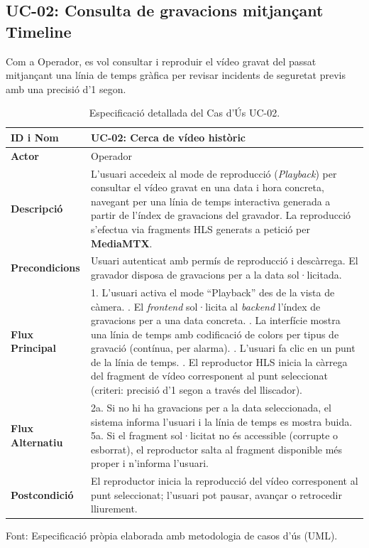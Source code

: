 \clearpage
\subsection{UC-02: Consulta de gravacions mitjançant Timeline}
Com a Operador, es vol consultar i reproduir el vídeo gravat del passat mitjançant una línia de temps gràfica per revisar incidents de seguretat previs amb una precisió d'1 segon.

\begin{table}[htbp]
  \centering
  \small
  \begin{tabular}{|l|p{10cm}|}
    \hline
    \rowcolor{backcolour} \textbf{ID i Nom} & \textbf{UC-02: Cerca de vídeo històric}              \\ \hline
    \textbf{Actor}                          & Operador                                             \\ \hline
    \textbf{Descripció}                     & L'usuari accedeix al mode de reproducció (\textit{Playback}) per consultar el vídeo gravat en una data i hora concreta, navegant per una línia de temps interactiva generada a partir de l'índex de gravacions del gravador. La reproducció s'efectua via fragments HLS generats a petició per \textbf{MediaMTX}. \\ \hline
    \textbf{Precondicions}                  & Usuari autenticat amb permís de reproducció i descàrrega. El gravador disposa de gravacions per a la data sol·licitada.         \\ \hline
    \textbf{Flux Principal}                 &
    1. L'usuari activa el mode ``Playback'' des de la vista de càmera. \newline
    2. El \textit{frontend} sol·licita al \textit{backend} l'índex de gravacions per a una data concreta. \newline
    3. La interfície mostra una línia de temps amb codificació de colors per tipus de gravació (contínua, per alarma). \newline
    4. L'usuari fa clic en un punt de la línia de temps. \newline
    5. El reproductor HLS inicia la càrrega del fragment de vídeo corresponent al punt seleccionat (criteri: precisió d'1 segon a través del lliscador). \\ \hline
    \textbf{Flux Alternatiu}                &
    2a. Si no hi ha gravacions per a la data seleccionada, el sistema informa l'usuari i la línia de temps es mostra buida. \newline
    5a. Si el fragment sol·licitat no és accessible (corrupte o esborrat), el reproductor salta al fragment disponible més proper i n'informa l'usuari. \\ \hline
    \textbf{Postcondició}                   & El reproductor inicia la reproducció del vídeo corresponent al punt seleccionat; l'usuari pot pausar, avançar o retrocedir lliurement. \\ \hline
  \end{tabular}
  \caption{Especificació detallada del Cas d'Ús UC-02.}
  \label{tab:uc_playback}
\par\smallskip
\small Font: Especificació pròpia elaborada amb metodologia de casos d'ús (UML).
\end{table}

